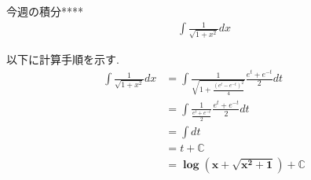 \documentclass[main]{subfiles}
\begin{document}

\begin{mondai}{6}{今週の積分}{****}
    \begin{align*}
        \int \frac{1}{\sqrt{1+x^2}} dx
    \end{align*}
\end{mondai}


\solutionhead
\hfill
以下に計算手順を示す.
\hfill\
\begin{align*}
    \int \frac{1}{\sqrt{1+x^2}} dx
        &= \int \frac{1}{\sqrt{1+\frac{\left(e^t-e^{-t}\right)^2}{4}}} \frac{e^t+e^{-t}}{2}dt \\
        &= \int \frac{1}{\frac{e^t+e^{-t}}{2}}\frac{e^t+e^{-t}}{2} dt \\
        &= \int dt \\
        &= t+\mathbb{C} \\
        &= \boldsymbol{\log \left(x+\sqrt{x^2+1}\right)+\mathbb{C}}
\end{align*}
\end{document}
